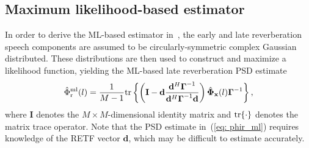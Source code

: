 \documentclass{article}
\begin{document}
\subsection{Maximum likelihood-based estimator}
In order to derive the ML-based estimator in~\cite{Kuklasinski_EUSIPCO_2014g}, the early and late reverberation speech components are assumed to be circularly-symmetric complex Gaussian distributed.
These distributions are then used to construct and maximize a likelihood function, yielding the ML-based late reverberation PSD estimate
\begin{equation}
\label{eq: phir_ml}
\hat{\Phi}_{\rm r}^{\rm ml}(l)  = \frac{1}{M-1} {\rm tr} \left\{  \left( \mathbf{I} - \mathbf{d} \frac{\mathbf{d}^{H}\boldsymbol{\Gamma}^{-1}}{\mathbf{d}^H\boldsymbol{\Gamma}^{-1}\mathbf{d}} \right) \hat{\boldsymbol{\Phi}}_{\mathbf{x}}(l)\boldsymbol{\Gamma}^{-1}\right\},
\end{equation}
where $\mathbf{I}$ denotes the $M \times M$-dimensional identity matrix and ${\rm tr}\{ \cdot \}$ denotes the matrix trace operator.
Note that the PSD estimate in~(\ref{eq: phir_ml}) requires knowledge of the RETF vector $\mathbf{d}$, which may be difficult to estimate accurately.
\end{document}
